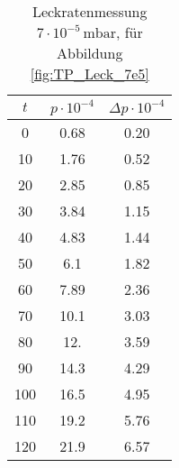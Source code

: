 \begin{table}[H]
    \centering
    \caption{Leckratenmessung $7 \cdot 10^{-5} \, \si{\milli\bar}$, für Abbildung \ref{fig:TP_Leck_7e5}}
    \label{tab:TP_Leck_7e5}
    \begin{tabular}{c c c}
        \toprule
        {$t$} & {$p \cdot 10^{-4}$} & {$\Delta p \cdot 10^{-4}$} \\
        \midrule
        0  &  0.68 & 0.20\\
        10 &  1.76 & 0.52\\
        20 &  2.85 & 0.85\\
        30 &  3.84 & 1.15\\
        40 &  4.83 & 1.44\\
        50 &  6.1  & 1.82\\
        60 &  7.89 & 2.36\\
        70 &  10.1 & 3.03\\
        80 &  12.  & 3.59\\
        90 &  14.3 & 4.29\\
        100 & 16.5 & 4.95\\
        110 & 19.2 & 5.76\\
        120 & 21.9 & 6.57\\
        \bottomrule
    \end{tabular}
\end{table}

